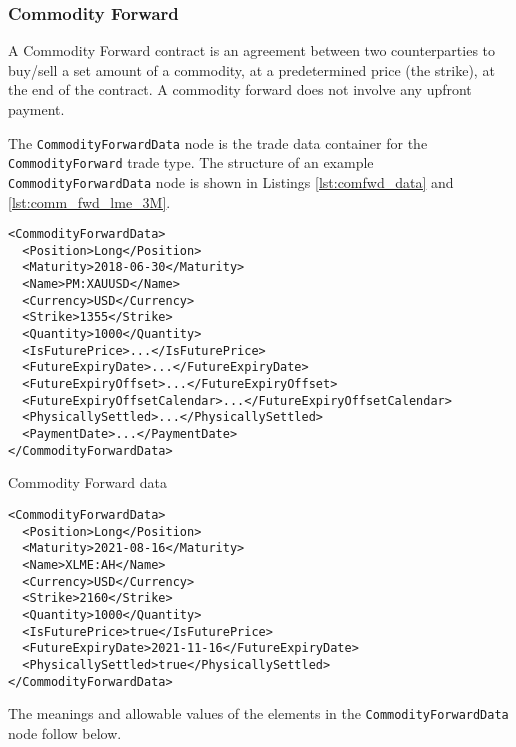 \subsubsection{Commodity Forward}

A Commodity Forward contract is an agreement between two counterparties to buy/sell
a set amount of a commodity, at a predetermined price (the strike), at the end of 
the contract. A commodity forward does not involve any upfront payment.

The \lstinline!CommodityForwardData! node is the trade data container for the \lstinline!CommodityForward! trade type. The structure of an example \lstinline!CommodityForwardData! node is shown in Listings \ref{lst:comfwd_data} and \ref{lst:comm_fwd_lme_3M}.

\begin{listing}[H]
\begin{verbatim}
<CommodityForwardData>
  <Position>Long</Position>
  <Maturity>2018-06-30</Maturity>
  <Name>PM:XAUUSD</Name>
  <Currency>USD</Currency>
  <Strike>1355</Strike>
  <Quantity>1000</Quantity>
  <IsFuturePrice>...</IsFuturePrice>
  <FutureExpiryDate>...</FutureExpiryDate>
  <FutureExpiryOffset>...</FutureExpiryOffset>
  <FutureExpiryOffsetCalendar>...</FutureExpiryOffsetCalendar>
  <PhysicallySettled>...</PhysicallySettled>
  <PaymentDate>...</PaymentDate>
</CommodityForwardData>
\end{verbatim}
\caption{Commodity Forward data}
\label{lst:comfwd_data}
\end{listing}

\begin{listing}[H]
\begin{verbatim}
<CommodityForwardData>
  <Position>Long</Position>
  <Maturity>2021-08-16</Maturity>
  <Name>XLME:AH</Name>
  <Currency>USD</Currency>
  <Strike>2160</Strike>
  <Quantity>1000</Quantity>
  <IsFuturePrice>true</IsFuturePrice>
  <FutureExpiryDate>2021-11-16</FutureExpiryDate>
  <PhysicallySettled>true</PhysicallySettled>
</CommodityForwardData>
\end{verbatim}
\caption{\lstinline!CommodityForwardData! for forward on LME Aluminium 3M future.}
\label{lst:comm_fwd_lme_3M}
\end{listing}

The meanings and allowable values of the elements in the \lstinline!CommodityForwardData! node follow below.

